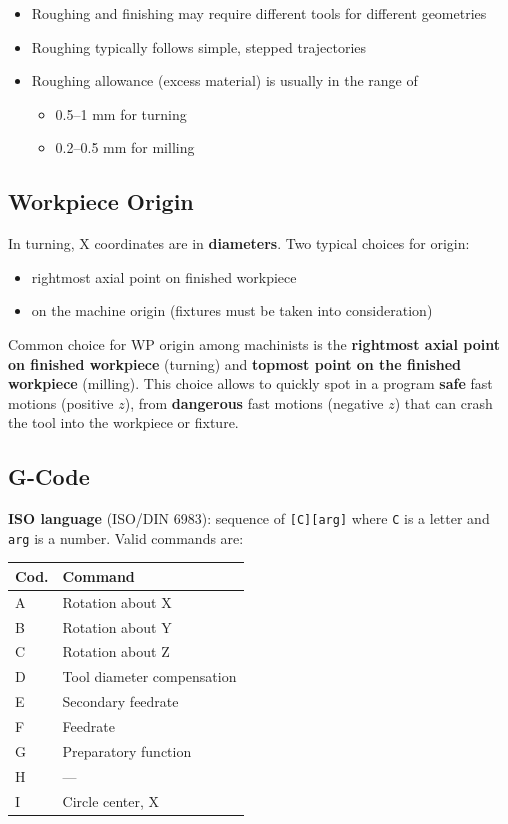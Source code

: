 \documentclass[
  letterpaper,
  DIV=11,
  numbers=noendperiod]{scrartcl}
\newcounter{none} %
\providecommand{\tightlist}{%
  \setlength{\itemsep}{0pt}\setlength{\parskip}{0pt}}
\begin{document}
\begin{itemize}
\tightlist
\item
  Roughing and finishing may require different tools for different
  geometries
\item
  Roughing typically follows simple, stepped trajectories
\item
  Roughing allowance (excess material) is usually in the range of

  \begin{itemize}
  \tightlist
  \item
    0.5--1 mm for turning
  \item
    0.2--0.5 mm for milling
  \end{itemize}
\end{itemize}

\subsection{Workpiece Origin}\label{workpiece-origin}

In turning, X coordinates are in \textbf{diameters}. Two typical choices
for origin:

\begin{itemize}
\tightlist
\item
  rightmost axial point on finished workpiece
\item
  on the machine origin (fixtures must be taken into consideration)
\end{itemize}

Common choice for WP origin among machinists is the \textbf{rightmost
axial point on finished workpiece} (turning) and \textbf{topmost point
on the finished workpiece} (milling). This choice allows to quickly spot
in a program \textbf{safe} fast motions (positive \(z\)), from
\textbf{dangerous} fast motions (negative \(z\)) that can crash the tool
into the workpiece or fixture.

\subsection{G-Code}\label{g-code}

\textbf{ISO language} (ISO/DIN 6983): sequence of
\texttt{{[}C{]}{[}arg{]}} where \texttt{C} is a letter and \texttt{arg}
is a number. Valid commands are:

{\def\LTcaptype{none} %
\begin{longtable}[]{@{}ll@{}}
\toprule\noalign{}
Cod. & Command \\
\midrule\noalign{}
\endhead
\bottomrule\noalign{}
\endlastfoot
A & Rotation about X \\
B & Rotation about Y \\
C & Rotation about Z \\
D & Tool diameter compensation \\
E & Secondary feedrate \\
F & Feedrate \\
G & Preparatory function \\
H & --- \\
I & Circle center, X \\
\end{longtable}
}
\end{document}

